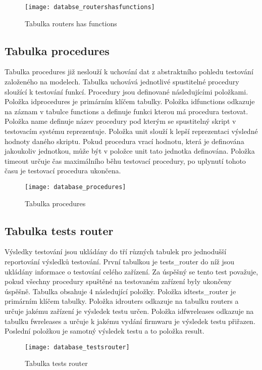\begin{figure}[h]
  \centering
  \texttt{[image: databse\_routershasfunctions]}
  \caption{Tabulka routers has functions}
  \label{fig:databse_routershasfunctions}
\end{figure}

\subsection{Tabulka procedures}
Tabulka procedures již neslouží k uchování dat z abstraktního pohledu testování založeného na modelech. Tabulka uchovává jednotlivé spustitelné procedury sloužící k testování funkcí. Procedury jsou definované následujícími položkami. Položka idprocedures je primárním klíčem tabulky. Položka idfunctions odkazuje na záznam v tabulce functions a definuje funkci kterou má procedura testovat. Položka name definuje název procedury pod kterým se spustitelný skript v testovacím systému reprezentuje. Položka unit slouží k lepší reprezentaci výsledné hodnoty daného skriptu. Pokud procedura vrací hodnotu, která je definována jakoukoliv jednotkou, může být v položce unit tato jednotka definována. Položka timeout určuje čas maximálního běhu testovací procedury, po uplynutí tohoto času je testovací procedura ukončena.

\begin{figure}[h]
  \centering
  \texttt{[image: database\_procedures]}
  \caption{Tabulka procedures}
  \label{fig:database_procedures}
\end{figure}

\subsection{Tabulka tests router}
Výsledky testování jsou ukládány do tří různých tabulek pro jednodušší reportování výsledků testování. První tabulkou je tests\_router do níž jsou ukládány informace o testování celého zařízení. Za úspěšný se tento test považuje, pokud všechny procedury spuštěné na testovaném zařízení byly ukončeny úspěšně. Tabulka obsahuje 4 následující položky. Položka idtests\_router je primárním klíčem tabulky. Položka idrouters odkazuje na tabulku routers a určuje jakému zařízení je výsledek testu určen. Položka idfwreleases odkazuje na tabulku fwreleases a určuje k jakému vydání firmwaru je výsledek testu přiřazen. Poslední položkou je samotný výsledek testu a to položka result.

\begin{figure}[h]
  \centering
  \texttt{[image: database\_testsrouter]}
  \caption{Tabulka tests router}
  \label{fig:database_testsrouter}
\end{figure}

